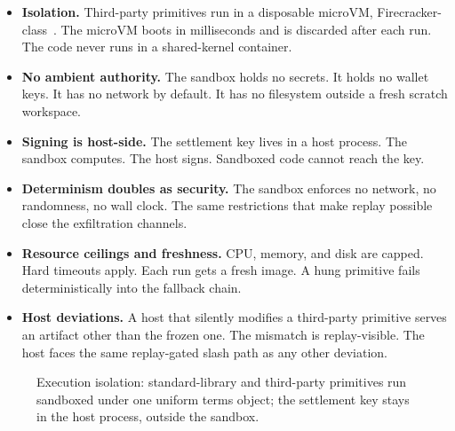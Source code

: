 \documentclass[11pt]{article}
\begin{document}
\begin{itemize}
    \item \textbf{Isolation.} Third-party primitives run in a
          disposable microVM, Firecracker-class~\cite{agache2020}. The
          microVM boots in milliseconds and is discarded after each run.
          The code never runs in a shared-kernel container.
    \item \textbf{No ambient authority.} The sandbox holds no
          secrets. It holds no wallet keys. It has no network by default.
          It has no filesystem outside a fresh scratch workspace.
    \item \textbf{Signing is host-side.} The settlement key lives in
          a host process. The sandbox computes. The host signs. Sandboxed
          code cannot reach the key.
    \item \textbf{Determinism doubles as security.} The sandbox
          enforces no network, no randomness, no wall clock. The same
          restrictions that make replay possible close the exfiltration
          channels.
    \item \textbf{Resource ceilings and freshness.} CPU, memory, and
          disk are capped. Hard timeouts apply. Each run gets a fresh
          image. A hung primitive fails deterministically into the fallback
          chain.
    \item \textbf{Host deviations.} A host that silently modifies a
          third-party primitive serves an artifact other than the frozen
          one. The mismatch is replay-visible. The host faces the same
          replay-gated slash path as any other deviation.
\end{itemize}

\begin{figure}[t]
    \centering
    \caption{Execution isolation: standard-library and third-party
        primitives run sandboxed under one uniform terms object; the
        settlement key stays in the host process, outside the sandbox.}
    \label{fig:isolation}
\end{figure}
\end{document}
